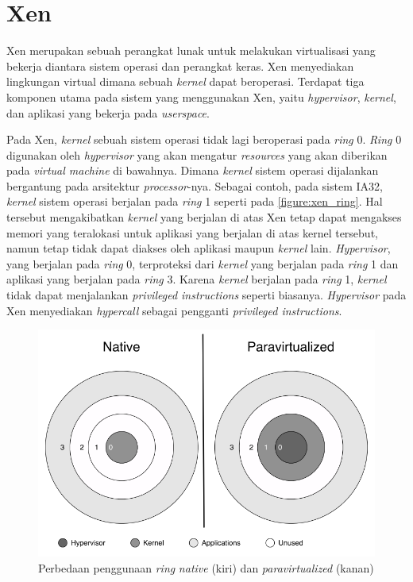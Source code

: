 \section{Xen}

Xen merupakan sebuah perangkat lunak untuk melakukan virtualisasi yang bekerja diantara sistem
operasi dan perangkat keras.  Xen menyediakan lingkungan virtual dimana sebuah \textit{kernel}
dapat beroperasi.  Terdapat tiga komponen utama pada sistem yang menggunakan Xen, yaitu
\textit{hypervisor}, \textit{kernel}, dan aplikasi yang bekerja pada \textit{userspace}.

Pada Xen, \textit{kernel} sebuah sistem operasi tidak lagi beroperasi pada \textit{ring} 0.
\textit{Ring} 0 digunakan oleh \textit{hypervisor} yang akan mengatur \textit{resources} yang
akan diberikan pada \textit{virtual machine} di bawahnya.  Dimana \textit{kernel} sistem operasi
dijalankan bergantung pada arsitektur \textit{processor}-nya.  Sebagai contoh, pada sistem IA32,
\textit{kernel} sistem operasi berjalan pada \textit{ring} 1 seperti pada
\autoref{figure:xen_ring}.  Hal tersebut mengakibatkan \textit{kernel} yang berjalan di atas Xen
tetap dapat mengakses memori yang teralokasi untuk aplikasi yang berjalan di atas kernel
tersebut, namun tetap tidak dapat diakses oleh aplikasi maupun \textit{kernel} lain.
\textit{Hypervisor}, yang berjalan pada \textit{ring} 0, terproteksi dari \textit{kernel} yang
berjalan pada \textit{ring} 1 dan aplikasi yang berjalan pada \textit{ring} 3.  Karena
\textit{kernel} berjalan pada \textit{ring} 1, \textit{kernel} tidak dapat menjalankan
\textit{privileged instructions} seperti biasanya.  \textit{Hypervisor} pada Xen menyediakan
\textit{hypercall} sebagai pengganti \textit{privileged instructions}.

\begin{figure}[htbp]
    \includegraphics[scale=0.5]{./resources/xen-ring.png}
    \caption[Perbedaan penggunaan \textit{ring} \textit{native} dan
    \textit{paravirtualized}]{Perbedaan penggunaan \textit{ring} \textit{native} (kiri) dan
    \textit{paravirtualized} (kanan) \citep{Chisnall2014}}
    \label{figure:xen_ring}
\end{figure}

